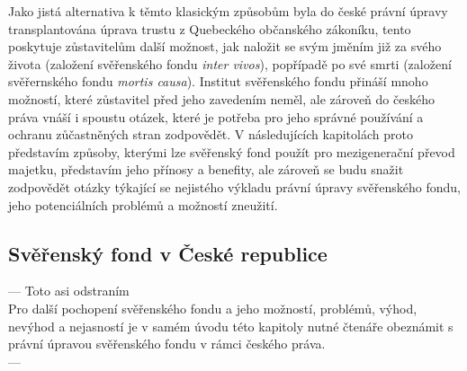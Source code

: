 \documentclass{article}
\begin{document}
Jako jistá alternativa k těmto klasickým způsobům byla do české právní úpravy transplantována úprava trustu z Quebeckého občanského zákoníku, tento poskytuje zůstavitelům další možnost, jak naložit se svým jměním již za svého života (založení svěřenského fondu \textit{inter vivos}), popřípadě po své smrti (založení svěřernského fondu \textit{mortis causa}). Institut svěřenského fondu přináší mnoho možností, které zůstavitel před jeho zavedením neměl, ale zároveň do českého práva vnáší i spoustu otázek, které je potřeba pro jeho správné používání a ochranu zůčastněných stran zodpovědět. V následujících kapitolách proto představím způsoby, kterými lze svěřenský fond použít pro mezigenerační převod majetku, představím jeho přínosy a benefity, ale zároveň se budu snažit zodpovědět otázky týkající se nejistého výkladu právní úpravy svěřenského fondu, jeho potenciálních problémů a možností zneužití. \\

\newpage

\thispagestyle{smallertextinheader}

\subsection{Svěřenský fond v České republice}

--- Toto asi odstraním\\
Pro další pochopení svěřenského fondu a jeho možností, problémů, výhod, nevýhod a nejasností je v samém úvodu této kapitoly nutné čtenáře obeznámit s právní úpravou svěřenského fondu v rámci českého práva. \\
---\\
\end{document}
